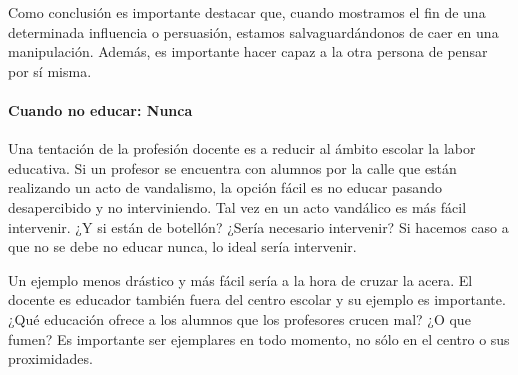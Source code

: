 Como conclusión es importante destacar que, cuando mostramos el fin de una determinada influencia o persuasión, estamos salvaguardándonos de caer en una manipulación.
%
Además, es importante hacer capaz a la otra persona de pensar por sí misma. 



\paragraph{Cuando no educar: Nunca}
Una tentación de la profesión docente es a reducir al ámbito escolar la labor educativa.
%
Si un profesor se encuentra con alumnos por la calle que están realizando un acto de vandalismo, la opción fácil es no educar pasando desapercibido y no interviniendo.
%
Tal vez en un acto vandálico es más fácil intervenir.
%
¿Y si están de botellón? ¿Sería necesario intervenir? 
%
Si hacemos caso a que no se debe no educar nunca, lo ideal sería intervenir.

Un ejemplo menos drástico y más fácil sería a la hora de cruzar la acera. 
%
El docente es educador también fuera del centro escolar y su ejemplo es importante.
%
¿Qué educación ofrece a los alumnos que los profesores crucen mal? 
%
¿O que fumen?
%
Es importante ser ejemplares en todo momento, no sólo en el centro o sus proximidades.


